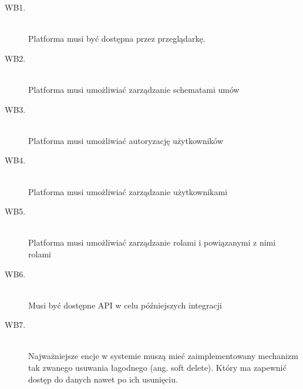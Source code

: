 \begin{description}
    \item[WB1.] \hfill \\
    Platforma musi być dostępna przez przeglądarkę. 

    \item[WB2.] \hfill \\
    Platforma musi umożliwiać zarządzanie schematami umów  

    \item[WB3.] \hfill \\
    Platforma musi umożliwiać autoryzację użytkowników  

    \item[WB4.] \hfill \\
    Platforma musi umożliwiać zarządzanie użytkownikami 

    \item[WB5.] \hfill \\
    Platforma musi umożliwiać zarządzanie rolami i powiązanymi z nimi rolami 

    \item[WB6.] \hfill \\
    Musi być dostępne API w celu późniejszych integracji 

    \item[WB7.] \hfill \\
    Najważniejsze encje w systemie muszą mieć zaimplementowany mechanizm tak zwanego usuwania łagodnego (ang. soft delete). Który ma zapewnić dostęp do danych nawet po ich usunięciu. 
\end{description}